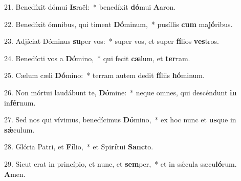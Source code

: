 21. Benedíxit dómui \textbf{Is}raël:~*  benedíxit \textbf{dó}mui \textbf{A}aron.\

22. Benedíxit ómnibus, qui timent \textbf{Dó}minum,~*  pusíllis \textbf{cum} ma\textbf{jó}ribus.\

23. Adjíciat Dóminus \textbf{su}per vos:~*  super vos, et super \textbf{fí}lios \textbf{ves}tros.\

24. Benedícti vos a \textbf{Dó}mino,~*  qui fecit \textbf{cæ}lum, et \textbf{ter}ram.\

25. Cælum cæli \textbf{Dó}mino:~*  terram autem dedit \textbf{fí}liis \textbf{hó}minum.\

26. Non mórtui laudábunt te, \textbf{Dó}mine:~*  neque omnes, qui descéndunt \textbf{in} in\textbf{fér}num.\

27. Sed nos qui vívimus, benedícimus \textbf{Dó}mino,~*  ex hoc nunc et \textbf{us}que in \textbf{sǽ}culum.\

28. Glória Patri, et \textbf{Fí}lio,~*  et Spi\textbf{rí}tui \textbf{Sanc}to.\

29. Sicut erat in princípio, et nunc, et \textbf{sem}per,~*  et in sǽcula sæcu\textbf{ló}rum. \textbf{A}men.\

